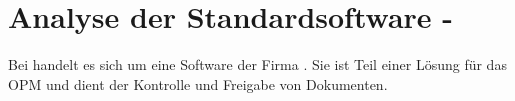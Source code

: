 \clearpage
\section{Analyse der Standardsoftware - \docdesk{}}
Bei \docdesk{} handelt es sich um eine Software der Firma \compart{}.
Sie ist Teil einer Lösung für das \acrlong{OPM} und dient der Kontrolle und Freigabe von Dokumenten.

